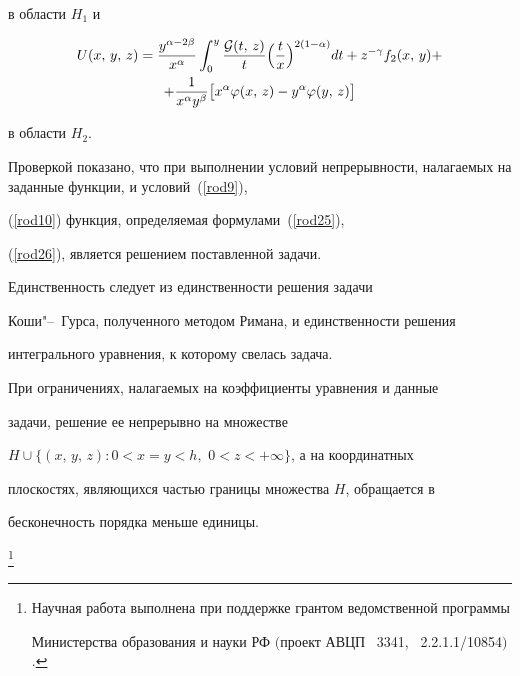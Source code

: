 в области $H_1$ и

\begin{multline}

U(x,\,y,\,z)=

\frac{y^{\alpha-2\beta}}{x^\alpha}\int _0^y\frac{{\cal

G}(t,\,z)}{t} \Bigl(\frac{t}{x}\Bigr)^{2(1-\alpha)}dt+

z^{-\gamma}f_2(x,\,y)+\\

+ \frac{1}{x^\alpha

y^\beta}\bigl[x^\alpha\varphi(x,\,z)-y^\alpha\varphi(y,\,z)\bigr]

\label{rod26}

\end{multline}

 в области $H_2$.





Проверкой показано, что при  выполнении условий непрерывности, налагаемых на заданные функции, и условий~(\ref{rod9}),

(\ref{rod10}) функция, определяемая формулами~(\ref{rod25}),

(\ref{rod26}), является решением поставленной задачи.

Единственность следует из единственности решения задачи

Коши"--~Гурса, полученного методом Римана, и единственности решения

интегрального уравнения, к которому свелась задача.



При ограничениях, налагаемых на коэффициенты уравнения и данные

задачи, решение ее непрерывно на множестве

$H\cup\{(x,\,y,\,z):0<x=y<h,$ $0<z<+\infty\}$, а на координатных

плоскостях, являющихся частью границы множества $H$, обращается в

бесконечность порядка меньше единицы.





\thanks{Научная работа выполнена при поддержке грантом ведомственной программы

Министерства образования и науки РФ $($проект \rm АВЦП \No~3341, \No~2.2.1.1/10854$)$.}





\pagebreak




